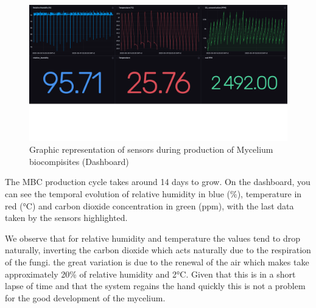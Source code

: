 \begin{figure}[h]
    \centering
    \includegraphics[width=1.7\textwidth]{images/dashboard_all.png}
    \caption{Graphic representation of sensors during production of Mycelium biocompisites (Dashboard)}
    \label{fig:dashboardbig}
\end{figure} 

The MBC production cycle takes around 14 days to grow. On the dashboard, you can see the temporal evolution of relative humidity in blue (\%), temperature in red (°C) and carbon dioxide concentration in green (ppm), with the last data taken by the sensors highlighted.

We observe that for relative humidity and temperature the values tend to drop naturally, inverting the carbon dioxide which acts naturally due to the respiration of the fungi. the great variation is due to the renewal of the air which makes take approximately 20\% of relative humidity and 2°C. Given that this is in a short lapse of time and that the system regains the hand quickly this is not a problem for the good development of the mycelium.



